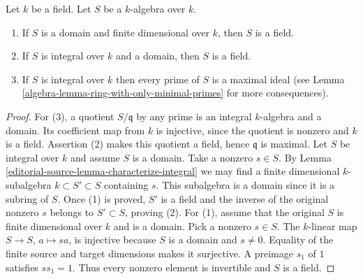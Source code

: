 \begin{lemma}
\label{editorial-source-lemma-integral-over-field}
Let $k$ be a field. Let $S$ be a $k$-algebra over $k$.
\begin{enumerate}
\item If $S$ is a domain and finite dimensional over $k$,
then $S$ is a field.
\item If $S$ is integral over $k$ and a domain,
then $S$ is a field.
\item If $S$ is integral over $k$ then every prime of
$S$ is a maximal ideal (see
Lemma \ref{algebra-lemma-ring-with-only-minimal-primes}
for more consequences).
\end{enumerate}
\end{lemma}

\begin{proof}
For (3), a quotient $S/\mathfrak q$ by any prime is an integral
$k$-algebra and a domain. Its coefficient map from $k$ is injective,
since the quotient is nonzero and $k$ is a field. Assertion (2)
makes this quotient a field, hence $\mathfrak q$ is maximal.
Let $S$ be integral over $k$ and assume $S$ is a domain.
Take a nonzero $s\in S$. By Lemma
\ref{editorial-source-lemma-characterize-integral} we may find a
finite dimensional $k$-subalgebra $k \subset S' \subset S$
containing $s$. This subalgebra is a domain since it is a subring
of $S$. Once (1) is proved, $S'$ is a field and the inverse of
the original nonzero $s$ belongs to $S'\subset S$, proving (2).
For (1), assume that the original $S$ is finite dimensional over
$k$ and is a domain. Pick a nonzero $s\in S$. The $k$-linear
map $S\to S$, $a\mapsto sa$, is injective because $S$ is a
domain and $s\ne0$. Equality of the finite source and target
dimensions makes it surjective. A preimage $s_1$ of $1$ satisfies
$ss_1=1$. Thus every nonzero element is invertible and $S$ is a field.
\end{proof}